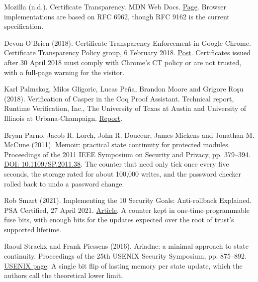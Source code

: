 \noindent Mozilla (n.d.). Certificate Transparency. MDN Web Docs. \href{https://developer.mozilla.org/en-US/docs/Web/Security/Defenses/Certificate_Transparency}{Page}. Browser implementations are based on RFC 6962, though RFC 9162 is the current specification.
\par\medskip

\noindent Devon O'Brien (2018). Certificate Transparency Enforcement in Google Chrome. Certificate Transparency Policy group, 6 February 2018. \href{https://groups.google.com/a/chromium.org/g/ct-policy/c/wHILiYf31DE/m/iMFmpMEkAQAJ}{Post}. Certificates issued after 30 April 2018 must comply with Chrome's CT policy or are not trusted, with a full-page warning for the visitor.
\par\medskip

\noindent Karl Palmskog, Milos Gligoric, Lucas Pe\~na, Brandon Moore and Grigore Ro\c{s}u (2018). Verification of Casper in the Coq Proof Assistant. Technical report, Runtime Verification, Inc., The University of Texas at Austin and University of Illinois at Urbana-Champaign. \href{https://github.com/runtimeverification/casper-proofs/blob/master/report/report.pdf}{Report}.
\par\medskip

\noindent Bryan Parno, Jacob R. Lorch, John R. Douceur, James Mickens and Jonathan M. McCune (2011). Memoir: practical state continuity for protected modules. Proceedings of the 2011 IEEE Symposium on Security and Privacy, pp. 379--394. \href{https://doi.org/10.1109/SP.2011.38}{DOI: 10.1109/SP.2011.38}. The counter that need only tick once every five seconds, the storage rated for about 100,000 writes, and the password checker rolled back to undo a password change.
\par\medskip

\noindent Rob Smart (2021). Implementing the 10 Security Goals: Anti-rollback Explained. PSA Certified, 27 April 2021. \href{https://www.psacertified.org/blog/anti-rollback-explained/}{Article}. A counter kept in one-time-programmable fuse bits, with enough bits for the updates expected over the root of trust's supported lifetime.
\par\medskip

\noindent Raoul Strackx and Frank Piessens (2016). Ariadne: a minimal approach to state continuity. Proceedings of the 25th USENIX Security Symposium, pp. 875--892. \href{https://www.usenix.org/conference/usenixsecurity16/technical-sessions/presentation/strackx}{USENIX page}. A single bit flip of lasting memory per state update, which the authors call the theoretical lower limit.
\par\medskip

